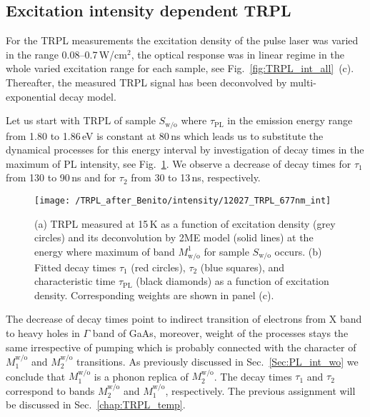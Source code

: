 %
%
%





\subsection{Excitation intensity dependent TRPL}
%
For the TRPL measurements the excitation density of the pulse laser was varied in the range 0.08--0.7$\,$W/cm$^2$, the optical response was in linear regime in the whole varied excitation range for each sample, see Fig.~\ref{fig:TRPL_int_all}~(c). Thereafter, the measured TRPL signal has been deconvolved by multi-exponential decay model. %

Let us start with TRPL of sample $S_\mathrm{w/o}$ where $\tau_\mathrm{PL}$ in the emission energy range from 1.80 to 1.86$\,$eV is constant at 80$\,$ns which leads us to substitute the dynamical processes for this energy interval by investigation of decay times in the maximum of PL intensity, see Fig.~\ref{fig:TRPL_int_wo}. We observe a decrease of decay times for $\tau_1$ from 130 to 90$\,$ns and for $\tau_2$ from 30 to 13$\,$ns, respectively.

\begin{figure}[!ht]
	\centering
	\texttt{[image: /TRPL\_after\_Benito/intensity/12027\_TRPL\_677nm\_int]}
	\caption{(a) TRPL measured at 15$\,$K as a function of excitation density (grey circles) and its deconvolution by 2ME model (solid lines) at the energy where maximum of band $M^1_\mathrm{w/o}$ for sample $S_\mathrm{w/o}$ occurs. (b) Fitted decay times $\tau_1$ (red circles), $\tau_2$ (blue squares), and characteristic time $\tau_\mathrm{PL}$ (black diamonds) as a function of excitation density. Corresponding weights are shown in panel (c).}
	\label{fig:TRPL_int_wo}
\end{figure}

The decrease of decay times point to indirect transition of electrons from X band to heavy holes in $\Gamma$ band of GaAs, moreover, weight of the processes stays the same irrespective of pumping which is probably connected with the character of $M_1^\mathrm{w/o}$ and $M_2^\mathrm{w/o}$ transitions. As previously discussed in Sec.~\ref{Sec:PL_int_wo} we conclude that $M_1^\mathrm{w/o}$ is a phonon replica of $M_2^\mathrm{w/o}$. The decay times $\tau_1$ and $\tau_2$ correspond to bands $M_2^\mathrm{w/o}$ and $M_1^\mathrm{w/o}$, respectively. The previous assignment will be discussed in Sec.~\ref{chap:TRPL_temp}.



